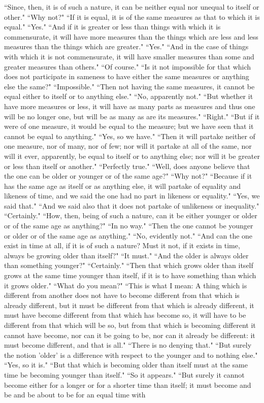 \documentclass[letterpaper,12pt]{article}
\newcommand{\stephpag}[1]{\marginnote{\small\itshape\fontfamily{ppl}\selectfont #1}}
\begin{document}
``Since, then, it is of such a nature, it can be neither equal nor unequal to itself or other." ``Why not?" ``If it is equal, it is of the same measures as that to which it is equal." ``Yes." ``And if it is greater or less than things \stephpag{c} with which it is commensurate, it will have more measures than the things which are less and less measures than the things which are greater." ``Yes." ``And in the case of things with which it is not commensurate, it will have smaller measures than some and greater measures than others." ``Of course." ``Is it not impossible for that which does not participate in sameness to have either the same measures or anything else the same?" ``Impossible." ``Then not having the same measures, it cannot be equal either to itself or to anything else." ``No, apparently not." ``But whether it have more measures or less, \stephpag{d} it will have as many parts as measures and thus one will be no longer one, but will be as many as are its measures." ``Right." ``But if it were of one measure, it would be equal to the measure; but we have seen that it cannot be equal to anything." ``Yes, so we have." ``Then it will partake neither of one measure, nor of many, nor of few; nor will it partake at all of the same, nor will it ever, apparently, be equal to itself or to anything else; nor will it be greater or less than itself or another." ``Perfectly true." \stephpag{e} ``Well, does anyone believe that the one can be older or younger or of the same age?" ``Why not?" ``Because if it has the same age as itself or as anything else, it will partake of equality and likeness of time, and we said the one had no part in likeness or equality." ``Yes, we said that." ``And we said also that it does not partake of unlikeness or inequality." ``Certainly." ``How, then, being of such a nature, \stephpag{141 a} can it be either younger or older or of the same age as anything?" ``In no way." ``Then the one cannot be younger or older or of the same age as anything." ``No, evidently not." ``And can the one exist in time at all, if it is of such a nature? Must it not, if it exists in time, always be growing older than itself?" ``It must." ``And the older is always older than something younger?" ``Certainly." ``Then that which grows older than itself grows at the same time younger than itself, if it is to have something than which it grows older." ``What do you mean?" \stephpag{b} ``This is what I mean: A thing which is different from another does not have to become different from that which is already different, but it must be different from that which is already different, it must have become different from that which has become so, it will have to be different from that which will be so, but from that which is becoming different it cannot have become, nor can it be going to be, nor can it already be different: it must become different, and that is all." ``There is no denying that." \stephpag{c} ``But surely the notion 'older' is a difference with respect to the younger and to nothing else." ``Yes, so it is." ``But that which is becoming older than itself must at the same time be becoming younger than itself." ``So it appears." ``But surely it cannot become either for a longer or for a shorter time than itself; it must become and be and be about to be for an equal time with 
\end{document}
